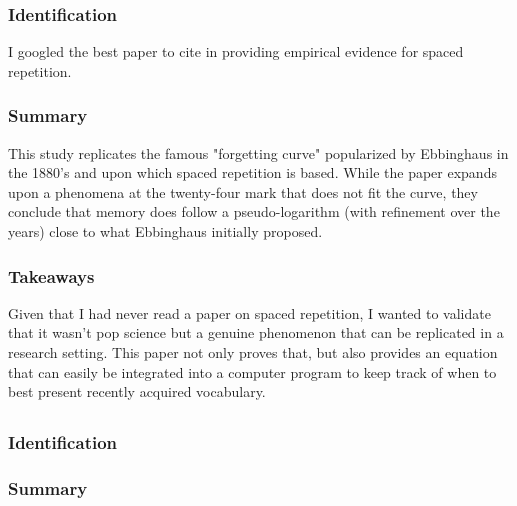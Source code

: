 \documentclass[
	letterpaper, %
]{jdf}
\begin{document}
\subsubsection{Identification}
I googled the best paper to cite in providing empirical evidence for spaced repetition.

\subsubsection{Summary}
This study replicates the famous "forgetting curve" popularized by Ebbinghaus in the 1880's and upon which spaced repetition is based. While the paper expands upon a phenomena at the twenty-four mark that does not fit the curve, they conclude that memory does follow a pseudo-logarithm (with refinement over the years) close to what Ebbinghaus initially proposed.

\subsubsection{Takeaways}
Given that I had never read a paper on spaced repetition, I wanted to validate that it wasn't pop science but a genuine phenomenon that can be replicated in a research setting. This paper not only proves that, but also provides an equation that can easily be integrated into a computer program to keep track of when to best present recently acquired vocabulary.

\subsection{\fullcite{}}
\subsubsection{Identification}

\subsubsection{Summary}
\end{document}
